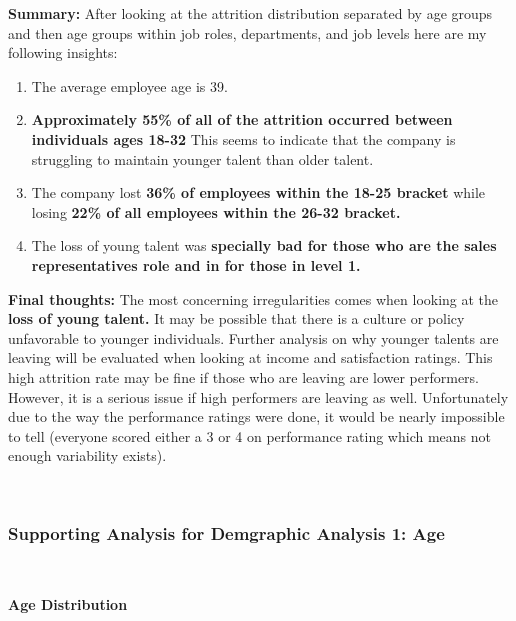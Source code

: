 \documentclass[
]{article}
\begin{document}
\textbf{Summary:} After looking at the attrition distribution separated
by age groups and then age groups within job roles, departments, and job
levels here are my following insights:

\begin{enumerate}
\def\labelenumi{\arabic{enumi}.}
\item
  The average employee age is 39.
\item
  \textbf{Approximately 55\% of all of the attrition occurred between
  individuals ages 18-32} This seems to indicate that the company is
  struggling to maintain younger talent than older talent.
\item
  The company lost \textbf{36\% of employees within the 18-25 bracket}
  while losing \textbf{22\% of all employees within the 26-32 bracket.}
\item
  The loss of young talent was \textbf{specially bad for those who are
  the sales representatives role and in for those in level 1.}
\end{enumerate}

\textbf{Final thoughts:} The most concerning irregularities comes when
looking at the \textbf{loss of young talent.} It may be possible that
there is a culture or policy unfavorable to younger individuals. Further
analysis on why younger talents are leaving will be evaluated when
looking at income and satisfaction ratings. This high attrition rate may
be fine if those who are leaving are lower performers. However, it is a
serious issue if high performers are leaving as well. Unfortunately due
to the way the performance ratings were done, it would be nearly
impossible to tell (everyone scored either a 3 or 4 on performance
rating which means not enough variability exists).

~

\hypertarget{supporting-analysis-for-demgraphic-analysis-1-age}{%
\subsubsection{Supporting Analysis for Demgraphic Analysis 1:
Age}\label{supporting-analysis-for-demgraphic-analysis-1-age}}

~

\textbf{Age Distribution}
\end{document}
